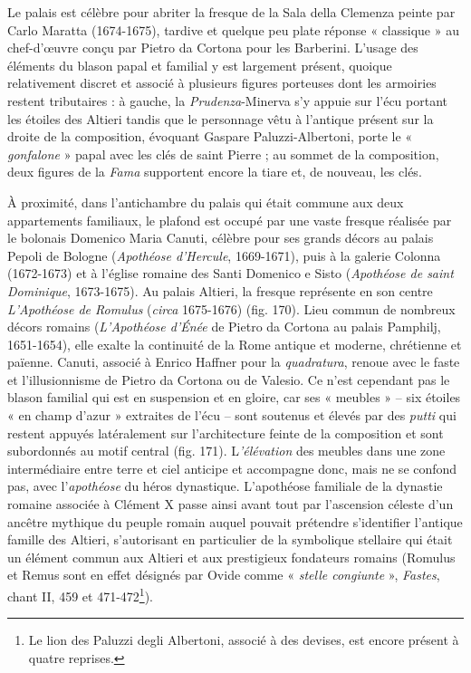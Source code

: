 \documentclass[12pt,twoside,openany]{book}
\begin{document}
Le palais est célèbre pour abriter la fresque de la Sala della Clemenza peinte par Carlo Maratta (1674-1675), tardive et quelque peu plate réponse « classique » au chef-d’œuvre conçu par Pietro da Cortona pour les Barberini. L’usage des éléments du blason papal et familial y est largement présent, quoique relativement discret et associé à plusieurs figures porteuses dont les armoiries restent tributaires : à gauche, la \textit{Prudenza}-Minerva s’y appuie sur l’écu portant les étoiles des Altieri tandis que le personnage vêtu à l’antique présent sur la droite de la composition, évoquant Gaspare Paluzzi-Albertoni, porte le « \textit{gonfalone} » papal avec les clés de saint Pierre ; au sommet de la composition, deux figures de la \textit{Fama} supportent encore la tiare et, de nouveau, les clés.

À proximité, dans l’antichambre du palais qui était commune aux deux appartements familiaux, le plafond est occupé par une vaste fresque réalisée par le bolonais Domenico Maria Canuti, célèbre pour ses grands décors au palais Pepoli de Bologne (\textit{Apothéose d’Hercule}, 1669-1671), puis à la galerie Colonna (1672-1673) et à l’église romaine des Santi Domenico e Sisto (\textit{Apothéose de saint Dominique}, 1673-1675). Au palais Altieri, la fresque représente en son centre \textit{L’Apothéose de Romulus }(\textit{circa} 1675-1676) (fig. 170). Lieu commun de nombreux décors romains (\textit{L’Apothéose d’Énée} de Pietro da Cortona au palais Pamphilj, 1651-1654), elle exalte la continuité de la Rome antique et moderne, chrétienne et païenne. Canuti, associé à Enrico Haffner pour la \textit{quadratura}, renoue avec le faste et l’illusionnisme de Pietro da Cortona ou de Valesio. Ce n’est cependant pas le blason familial qui est en suspension et en gloire, car ses « meubles » – six étoiles « en champ d’azur » extraites de l’écu – sont soutenus et élevés par des \textit{putti} qui restent appuyés latéralement sur l’architecture feinte de la composition et sont subordonnés au motif central (fig. 171). L\textit{’élévation} des meubles dans une zone intermédiaire entre terre et ciel anticipe et accompagne donc, mais ne se confond pas, avec l’\textit{apothéose} du héros dynastique. L’apothéose familiale de la dynastie romaine associée à Clément X passe ainsi avant tout par l’ascension céleste d’un ancêtre mythique du peuple romain auquel pouvait prétendre s’identifier l’antique famille des Altieri, s’autorisant en particulier de la symbolique stellaire qui était un élément commun aux Altieri et aux prestigieux fondateurs romains (Romulus et Remus sont en effet désignés par Ovide comme « \textit{stelle congiunte} », \textit{Fastes}, chant II, 459 et 471-472\footnote{Le lion des Paluzzi degli Albertoni, associé à des devises, est encore présent à quatre reprises.}).
\end{document}
